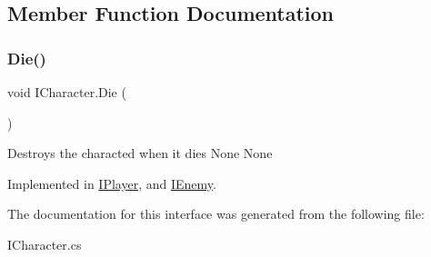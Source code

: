 \subsection{Member Function Documentation}
\mbox{\label{interface_i_character_ad58356e457f98d8a6f9548da446012ce}} 
\subsubsection{\texorpdfstring{Die()}{Die()}}
{\footnotesize\ttfamily void I\+Character.\+Die (\begin{DoxyParamCaption}{ }\end{DoxyParamCaption})}

Destroys the characted when it dies  None  None 

Implemented in \mbox{\hyperlink{class_i_player_a62499ee0288916e1220f64e18653c7b7}{I\+Player}}, and \mbox{\hyperlink{class_i_enemy_a53c76db616e0e102f1ddd3cfe2c8ed28}{I\+Enemy}}.



The documentation for this interface was generated from the following file\+:\begin{DoxyCompactItemize}
\item 
I\+Character.\+cs\end{DoxyCompactItemize}
